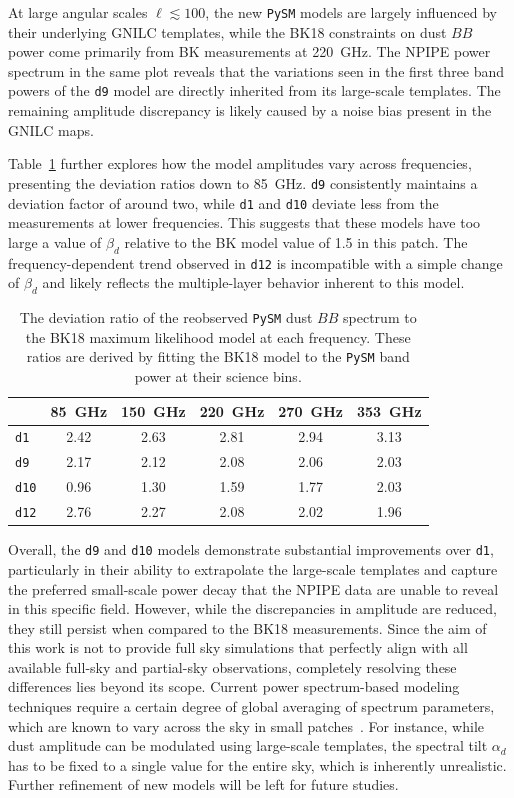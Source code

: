 \documentclass[twocolumn]{aastex631}
\begin{document}
At large angular scales $\ell \lesssim 100$, the new \texttt{PySM} models are largely influenced by their underlying GNILC templates, while the BK18 constraints on dust $BB$ power come primarily from BK measurements at 220~GHz. The NPIPE power spectrum in the same plot reveals that the variations seen in the first three band powers of the \texttt{d9} model are directly inherited from its large-scale templates. The remaining amplitude discrepancy is likely caused by a noise bias present in the GNILC maps.

Table~\ref{tab:BB_dustratio} further explores how the model amplitudes vary across frequencies, presenting the deviation ratios down to 85~GHz. \texttt{d9} consistently maintains a deviation factor of around two, while \texttt{d1} and \texttt{d10} deviate less from the measurements at lower frequencies. This suggests that these models have too large a value of $\beta_d$ relative to the BK model value of 1.5 in this patch. The frequency-dependent trend observed in \texttt{d12} is incompatible with a simple change of $\beta_d$ and likely reflects the multiple-layer behavior inherent to this model. 

\begin{table}
    \centering
    \begin{tabular}{lccccc}
    \toprule 
     & 85~GHz & 150~GHz & 220~GHz & 270~GHz & 353~GHz \\
    \midrule
    \texttt{d1}  & 2.42	& 2.63 & 2.81 & 2.94 & 3.13 \\
    \texttt{d9}  & 2.17 & 2.12 & 2.08 & 2.06 & 2.03 \\
    \texttt{d10} & 0.96 & 1.30 & 1.59 & 1.77 & 2.03 \\
    \texttt{d12} & 2.76	& 2.27 & 2.08 & 2.02 & 1.96 \\
   \bottomrule
    \end{tabular}
    \caption{The deviation ratio of the reobserved \texttt{PySM} dust $BB$ spectrum to the BK18 maximum likelihood model at each frequency. These ratios are derived by fitting the BK18 model to the \texttt{PySM} band power at their science bins.}
    \label{tab:BB_dustratio}
\end{table}

Overall, the \texttt{d9} and \texttt{d10} models demonstrate substantial improvements over \texttt{d1}, particularly in their ability to extrapolate the large-scale templates and capture the preferred small-scale power decay that the NPIPE data are unable to reveal in this specific field. However, while the discrepancies in amplitude are reduced, they still persist when compared to the BK18 measurements. Since the aim of this work is not to provide full sky simulations that perfectly align with all available full-sky and partial-sky observations, completely resolving these differences lies beyond its scope. Current power spectrum-based modeling techniques require a certain degree of global averaging of spectrum parameters, which are known to vary across the sky in small patches~\citep{planck2016-l04}. For instance, while dust amplitude can be modulated using large-scale templates, the spectral tilt $\alpha_d$ has to be fixed to a single value for the entire sky, which is inherently unrealistic. Further refinement of new models will be left for future studies. 
\end{document}
